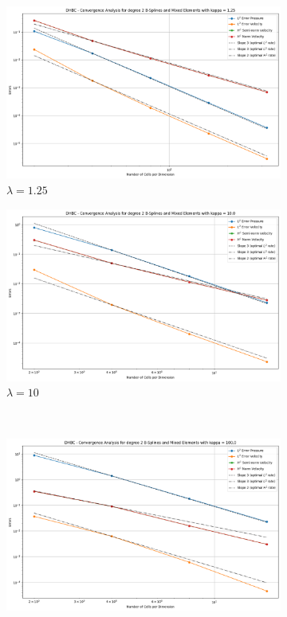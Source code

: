 \documentclass[a4paper,12pt,twoside]{report}
\begin{document}
\begin{figure}[!h]
	\centering
	\begin{subfigure}[b]{0.49\textwidth}
		\centering
		\includegraphics[width=\textwidth]{convergence_degree_2_mixed_dirichlet_homogeneous_kappa=1.25}
		\caption{$\lambda=1.25$}
	\end{subfigure}
	\begin{subfigure}[b]{0.49\textwidth}
		\centering
		\includegraphics[width=\textwidth]{convergence_degree_2_mixed_dirichlet_homogeneous_kappa=10.0}
		\caption{$\lambda=10$}
	\end{subfigure}
	\\
	\begin{subfigure}[b]{0.49\textwidth}
		\centering
		\includegraphics[width=\textwidth]{convergence_degree_2_mixed_dirichlet_homogeneous_kappa=100.0}

\end{subfigure}
\end{figure}
\end{document}
